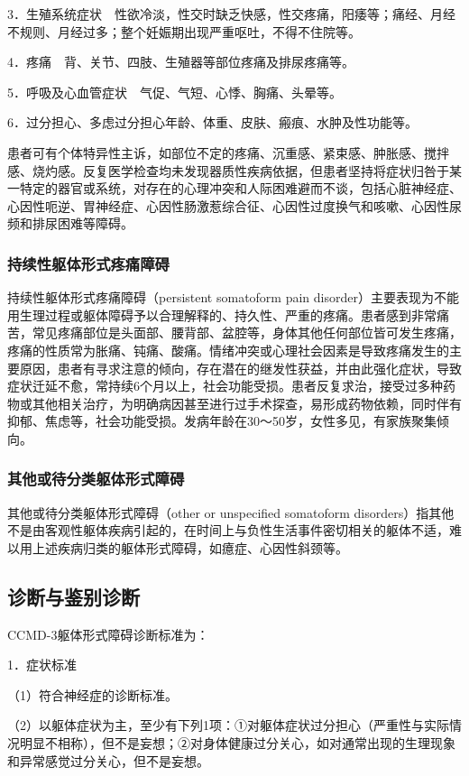 3．生殖系统症状　性欲冷淡，性交时缺乏快感，性交疼痛，阳痿等；痛经、月经不规则、月经过多；整个妊娠期出现严重呕吐，不得不住院等。

4．疼痛　背、关节、四肢、生殖器等部位疼痛及排尿疼痛等。

5．呼吸及心血管症状　气促、气短、心悸、胸痛、头晕等。

6．过分担心、多虑过分担心年龄、体重、皮肤、瘢痕、水肿及性功能等。

患者可有个体特异性主诉，如部位不定的疼痛、沉重感、紧束感、肿胀感、搅拌感、烧灼感。反复医学检查均未发现器质性疾病依据，但患者坚持将症状归咎于某一特定的器官或系统，对存在的心理冲突和人际困难避而不谈，包括心脏神经症、心因性呃逆、胃神经症、心因性肠激惹综合征、心因性过度换气和咳嗽、心因性尿频和排尿困难等障碍。

\subsubsection{持续性躯体形式疼痛障碍}

持续性躯体形式疼痛障碍（persistent somatoform pain
disorder）主要表现为不能用生理过程或躯体障碍予以合理解释的、持久性、严重的疼痛。患者感到非常痛苦，常见疼痛部位是头面部、腰背部、盆腔等，身体其他任何部位皆可发生疼痛，疼痛的性质常为胀痛、钝痛、酸痛。情绪冲突或心理社会因素是导致疼痛发生的主要原因，患者有寻求注意的倾向，存在潜在的继发性获益，并由此强化症状，导致症状迁延不愈，常持续6个月以上，社会功能受损。患者反复求治，接受过多种药物或其他相关治疗，为明确病因甚至进行过手术探查，易形成药物依赖，同时伴有抑郁、焦虑等，社会功能受损。发病年龄在30～50岁，女性多见，有家族聚集倾向。

\subsubsection{其他或待分类躯体形式障碍}

其他或待分类躯体形式障碍（other or unspecified somatoform
disorders）指其他不是由客观性躯体疾病引起的，在时间上与负性生活事件密切相关的躯体不适，难以用上述疾病归类的躯体形式障碍，如癔症、心因性斜颈等。

\subsection{诊断与鉴别诊断}

CCMD-3躯体形式障碍诊断标准为：

1．症状标准

（1）符合神经症的诊断标准。

（2）以躯体症状为主，至少有下列1项：①对躯体症状过分担心（严重性与实际情况明显不相称），但不是妄想；②对身体健康过分关心，如对通常出现的生理现象和异常感觉过分关心，但不是妄想。

